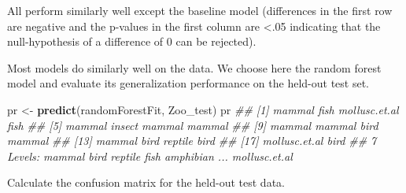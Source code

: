 \documentclass[
  notitlepage]{book}
\newenvironment{Shaded}{\begin{snugshade}}{\end{snugshade}}
\newcommand{\CommentTok}[1]{\textcolor[rgb]{0.56,0.35,0.01}{\textit{#1}}}
\newcommand{\KeywordTok}[1]{\textcolor[rgb]{0.13,0.29,0.53}{\textbf{#1}}}
\newcommand{\NormalTok}[1]{#1}
\newcommand{\StringTok}[1]{\textcolor[rgb]{0.31,0.60,0.02}{#1}}
\begin{document}
All perform similarly well except the baseline model (differences in the first row
are negative and the p-values in the first column are \textless.05 indicating
that the null-hypothesis of a difference of 0 can be rejected).

Most models do similarly well on the data. We choose here the random
forest model and evaluate its generalization performance on the held-out
test set.

\begin{Shaded}
\begin{Highlighting}[]
\NormalTok{pr \textless{}{-}}\StringTok{ }\KeywordTok{predict}\NormalTok{(randomForestFit, Zoo\_test)}
\NormalTok{pr}
\CommentTok{\#\#  [1] mammal        fish          mollusc.et.al fish         }
\CommentTok{\#\#  [5] mammal        insect        mammal        mammal       }
\CommentTok{\#\#  [9] mammal        mammal        bird          mammal       }
\CommentTok{\#\# [13] mammal        bird          reptile       bird         }
\CommentTok{\#\# [17] mollusc.et.al bird         }
\CommentTok{\#\# 7 Levels: mammal bird reptile fish amphibian ... mollusc.et.al}
\end{Highlighting}
\end{Shaded}

Calculate the confusion matrix for the held-out test data.
\end{document}
